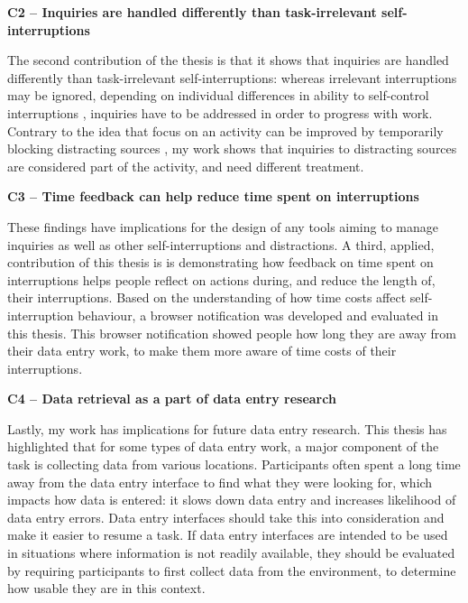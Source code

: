 \textbf{C2 – Inquiries are handled differently than task-irrelevant self-interruptions}

The second contribution of the thesis is that it shows that inquiries are handled differently than task-irrelevant self-interruptions: whereas irrelevant interruptions may be ignored, depending on individual differences in ability to self-control interruptions \citep{Lyngs2018}, inquiries have to be addressed in order to progress with work. Contrary to the idea that focus on an activity can be improved by temporarily blocking distracting sources \citep{Kim2017}, my work shows that inquiries to distracting sources are considered part of the activity, and need different treatment. 

\textbf{C3 – Time feedback can help reduce time spent on interruptions}

These findings have implications for the design of any tools aiming to manage inquiries as well as other self-interruptions and distractions. A third, applied, contribution of this thesis is 
 is demonstrating how feedback on time spent on interruptions helps people reflect on actions during, and reduce the length of, their interruptions. Based on the understanding of how time costs affect self-interruption behaviour, a browser notification was developed and evaluated in this thesis. This browser notification showed people how long they are away from their data entry work, to make them more aware of time costs of their interruptions. %

\textbf{C4 – Data retrieval as a part of data entry research}

Lastly, my work has implications for future data entry research. This thesis has highlighted that for some types of data entry work, a major component of the task is collecting data from various locations. Participants often spent a long time away from the data entry interface to find what they were looking for, which impacts how data is entered: it slows down data entry and increases likelihood of data entry errors. Data entry interfaces should take this into consideration and make it easier to resume a task. If data entry interfaces are intended to be used in situations where information is not readily available, they should be evaluated by requiring participants to first collect data from the environment, to determine how usable they are in this context. 

